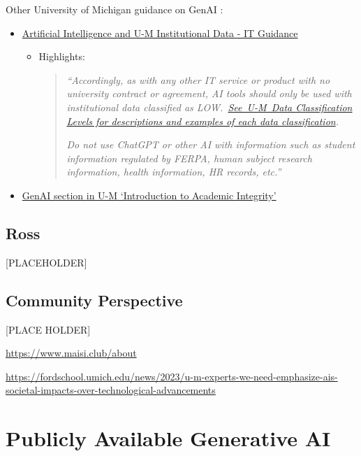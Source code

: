 \documentclass[
]{book}
\begin{document}
Other University of Michigan guidance on GenAI :

\begin{itemize}
\item
  \href{https://safecomputing.umich.edu/protect-the-u/safely-use-sensitive-data/AI-and-UM-Data}{Artificial Intelligence and U-M Institutional Data - IT Guidance}

  \begin{itemize}
  \item
    Highlights:

    \begin{quote}
    \emph{``Accordingly, as with any other IT service or product with no university contract or agreement, AI tools should only be used with institutional data classified as LOW.~\href{https://safecomputing.umich.edu/protect-the-u/safely-use-sensitive-data/classification-levels}{See~U-M~Data Classification Levels for descriptions and examples of each data classification}.}

    \emph{Do not use ChatGPT or other AI with information such as student information regulated by FERPA, human subject research information, health information, HR records, etc.''}
    \end{quote}
  \end{itemize}
\item
  \href{https://guides.lib.umich.edu/c.php?g=1039501\&p=9763907}{GenAI section in U-M `Introduction to Academic Integrity'}
\end{itemize}

\hypertarget{ross}{%
\section{Ross}\label{ross}}

{[}PLACEHOLDER{]}

\hypertarget{community-perspective}{%
\section{Community Perspective}\label{community-perspective}}

{[}PLACE HOLDER{]}

\url{https://www.maisi.club/about}

\url{https://fordschool.umich.edu/news/2023/u-m-experts-we-need-emphasize-ais-societal-impacts-over-technological-advancements}

\hypertarget{publicly-available-generative-ai}{%
\chapter{Publicly Available Generative AI}\label{publicly-available-generative-ai}}
\end{document}
